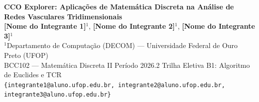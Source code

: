 \documentclass[11pt, a4paper]{article}
\begin{document}
\begin{center}
  {\LARGE \bfseries \textcolor{ufopred}{CCO Explorer: Aplicações de Matemática Discreta na Análise de Redes Vasculares Tridimensionais}}\\[0.4cm]
  {\large \textbf{[Nome do Integrante 1]}$^{1}$, \textbf{[Nome do Integrante 2]}$^{1}$, \textbf{[Nome do Integrante 3]}$^{1}$}\\[0.2cm]
  {\small $^{1}$Departamento de Computação (DECOM) --- Universidade Federal de Ouro Preto (UFOP)\\[0.1cm]
  BCC102 --- Matemática Discreta II \textbar{} Período 2026.2 \textbar{} Trilha Eletiva B1: Algoritmo de Euclides e TCR\\[0.1cm]
  \texttt{\{integrante1@aluno.ufop.edu.br, integrante2@aluno.ufop.edu.br, integrante3@aluno.ufop.edu.br\}}}\\[0.4cm]
\end{center}
\end{document}
